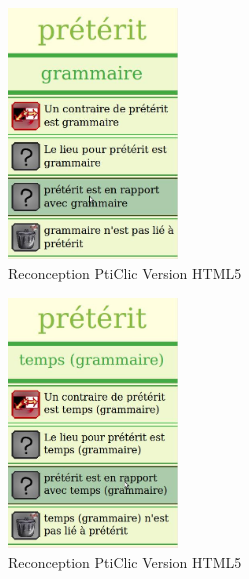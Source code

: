 \documentclass{beamer}
\begin{document}
\begin{frame}  
\begin{figure}[h!]
  \centering
      \includegraphics[width=0.4\textwidth]{img/preterit04.jpg}
\caption{Reconception PtiClic Version HTML5}
\end{figure}
\end{frame}

\begin{frame}  
\begin{figure}[h!]
  \centering
      \includegraphics[width=0.4\textwidth]{img/preterit05.jpg}
\caption{Reconception PtiClic Version HTML5}
\end{figure}
\end{frame}
\end{document}
